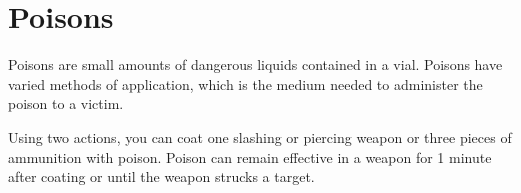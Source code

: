 \section{Poisons} \label{sec::poisons}
    Poisons are small amounts of dangerous liquids contained in a vial.
    Poisons have varied methods of application, which is the medium needed to administer the poison to a victim.

    Using two actions, you can coat one slashing or piercing weapon or three pieces of ammunition with poison.
    Poison can remain effective in a weapon for 1 minute after coating or until the weapon strucks a target.

